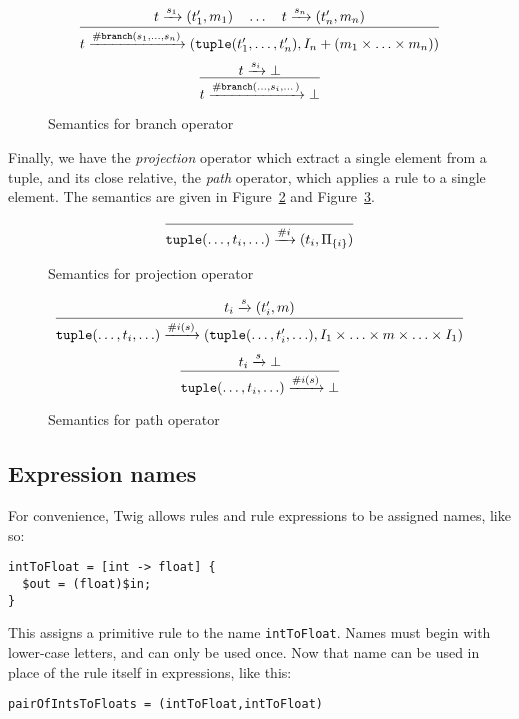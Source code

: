 \begin{figure}[ht]
\label{fig:branch}
\[
\infer
  {t \arr{\mathtt{\#branch}(s_1,\ldots,s_n)} (\mathtt{tuple}(t_1',\ldots,t_n'),I_n + (m_1 \times \ldots \times m_n))}
  {t \arr{s_1} (t_1',m_1) \quad \ldots \quad t \arr{s_n} (t_n',m_n)}
\]
\[
\infer
  {t \arr{\mathtt{\#branch}(\ldots,s_i,\dots)} \bot}
  {t \arr{s_i} \bot}
\]
\caption{Semantics for branch operator}
\end{figure}

Finally, we have the \emph{projection} operator which extract a single element from a tuple, and its close relative, the \emph{path} operator, which applies a rule to a single element. The semantics are given in Figure~\ref{fig:projection} and Figure~\ref{fig:path}.

\begin{figure}[ht]
\label{fig:projection}
\[
\infer
  {\mathtt{tuple}(\ldots,t_i,\ldots) \arr{\#i} (t_i,\Pi_{\{i\}})}
  {}
\]
\caption{Semantics for projection operator}
\end{figure}


\begin{figure}[ht]
\label{fig:path}
\[
\infer
  {\mathtt{tuple}(\ldots,t_i,\ldots) \arr{\#i(s)} (\mathtt{tuple}(\ldots,t_i',\ldots), I_1 \times \ldots \times m \times \ldots \times I_1)}
  {t_i \arr{s} (t_i',m)}
\]
\[
\infer
  {\mathtt{tuple}(\ldots,t_i,\ldots) \arr{\#i(s)} \bot}
  {t_i \arr{s} \bot}
\]
\caption{Semantics for path operator}
\end{figure}

\subsection{Expression names}
\label{section:names}

For convenience, Twig allows rules and rule expressions to be assigned names, like so:

\begin{verbatim}
intToFloat = [int -> float] {
  $out = (float)$in;
}
\end{verbatim}

This assigns a primitive rule to the name \texttt{intToFloat}. Names must begin with lower-case letters, and can only be used once. Now that name can be used in place of the rule itself in expressions, like this:

\begin{verbatim}
pairOfIntsToFloats = (intToFloat,intToFloat)
\end{verbatim}


